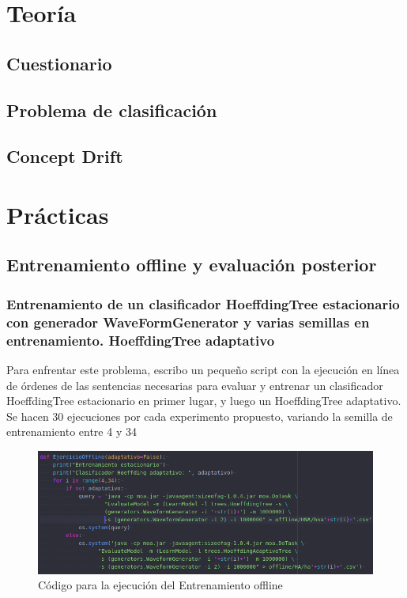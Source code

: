 \section{Teoría}

\subsection{Cuestionario}

\subsection{Problema de clasificación}

\subsection{Concept Drift}

\section{Prácticas}

\subsection{Entrenamiento offline y evaluación posterior}

\subsubsection{Entrenamiento de un clasificador HoeffdingTree estacionario con generador WaveFormGenerator y varias semillas en entrenamiento. HoeffdingTree adaptativo}

Para enfrentar este problema, escribo un pequeño script con la ejecución en línea de órdenes de las sentencias necesarias para evaluar y entrenar un clasificador HoeffdingTree estacionario en primer lugar, y luego un HoeffdingTree adaptativo. Se hacen 30 ejecuciones por cada experimento propuesto, variando la semilla de entrenamiento entre 4 y 34

\begin{figure}[H] %
	\centering
	\includegraphics[scale=0.5]{off-code.png}  %
	\caption{Código para la ejecución del Entrenamiento offline} 
	\label{fig:off1}
\end{figure}

